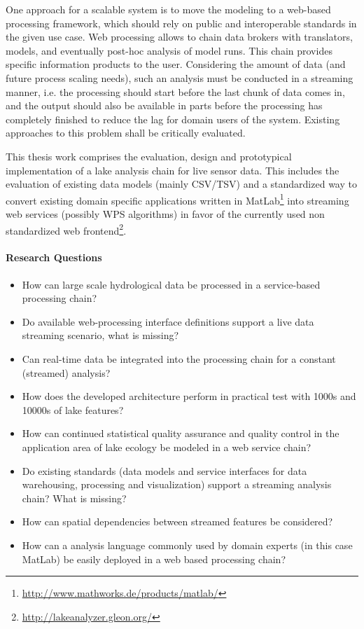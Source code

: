   One approach for a scalable system is to move the modeling to a web-based processing framework, which should rely on public and interoperable standards in the given use case.
  Web processing allows to chain data brokers with translators, models, and eventually post-hoc analysis of model runs.
  This chain provides specific information products to the user.
  Considering the amount of data (and future process scaling needs), such an analysis must be conducted in a streaming manner, i.e. the processing should start before the last chunk of data comes in, and the output should also be available in parts before the processing has completely finished to reduce the lag for domain users of the system.
  Existing approaches to this problem shall be critically evaluated.

  This thesis work comprises the evaluation, design and prototypical implementation of a lake analysis chain for live sensor data.
  This includes the evaluation of existing data models (mainly CSV/TSV) and a standardized way to convert existing domain specific applications written in MatLab\footnote{\url{http://www.mathworks.de/products/matlab/}} into streaming web services (possibly WPS algorithms) in favor of the currently used non standardized web frontend\footnote{\url{http://lakeanalyzer.gleon.org/}}.

  \paragraph*{Research Questions}
  \begin{itemize}
    \item How can large scale hydrological data be processed in a service-based processing chain?
    \item Do available web-processing interface definitions support a live data streaming scenario, what is missing?
    \item Can real-time data be integrated into the processing chain for a constant (streamed) analysis?
    \item How does the developed architecture perform in practical test with 1000s and 10000s of lake features?
    \item How can continued statistical quality assurance and quality control in the application area of lake ecology be modeled in a web service chain?
    \item Do existing standards (data models and service interfaces for data warehousing, processing and visualization) support a streaming analysis chain? What is missing?
    \item How can spatial dependencies between streamed features be considered?
    \item How can a analysis language commonly used by domain experts (in this case MatLab) be easily deployed in a web based processing chain?
  \end{itemize}

